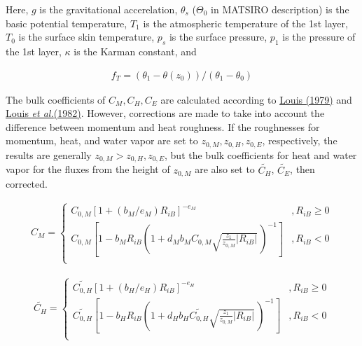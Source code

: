 Here, \(g\) is the gravitational accerelation, \(\theta_s\)
(\(\Theta_0\) in MATSIRO description) is the basic potential
temperature, \(T_1\) is the atmospheric temperature of the 1st layer,
\(T_0\) is the surface skin temperature, \(p_s\) is the surface
pressure, \(p_1\) is the pressure of the 1st layer, $\kappa $ is the
Karman constant, and

\begin{eqnarray}
f_T = (\theta_1 - \theta(z_0))/(\theta_1 - \theta_0)
\end{eqnarray}

The bulk coefficients of \(C_M,C_H,C_E\) are calculated according to
\href{https://link.springer.com/content/pdf/10.1007/BF00117978.pdf}{Louis
(1979)} and
\href{https://www.ecmwf.int/en/elibrary/10845-short-history-pbl-parameterization-ecmwf}{Louis
{\emph{et al.}}(1982)}. However, corrections are made to take into
account the difference between momentum and heat roughness. If the
roughnesses for momentum, heat, and water vapor are set to
\(z_{0,M}, z_{0,H}, z_{0,E}\), respectively, the results are generally
\(z_{0,M} > z_{0,H}, z_{0,E}\), but the bulk coefficients for heat and
water vapor for the fluxes from the height of \(z_{0,M}\) are also set
to \(\widetilde{C_H}\), \(\widetilde{C_E}\), then corrected.

\begin{eqnarray}
    C_M = \left\{
      \begin{array}{lr}
      C_{0,M} [ 1 + (b_M/e_M)  R_{iB} ]^{-e_M}
            &,
          R_{iB} \geq 0 \\
      C_{0,M} \left[ 1 - b_M R_{iB} \left( 1+ d_M b_M C_{0,M}
                                  \sqrt{\frac{z_1}{z_{0,M}}| R_{iB}|} \,
                                  \right)^{-1} \right]     
          &,
          R_{iB} < 0 \\
      \end{array} \right.
\end{eqnarray}

\begin{eqnarray}
    \widetilde{C_H} = \left\{
      \begin{array}{lr}
      \widetilde{C_{0,H}} [ 1 + (b_H/e_H) R_{iB} ]^{-e_H}
            &,
          R_{iB} \geq 0 \\
      \widetilde{C_{0,H}} \left[ 1 - b_H R_{iB}
                                  \left( 1+ d_H b_H \widetilde{C_{0,H}}
                                  \sqrt{\frac{z_1}{z_{0,M}}| R_{iB}|} \,
                                  \right)^{-1} \right]
             &,     
          R_{iB} < 0 \\
      \end{array} \right.
\end{eqnarray}

